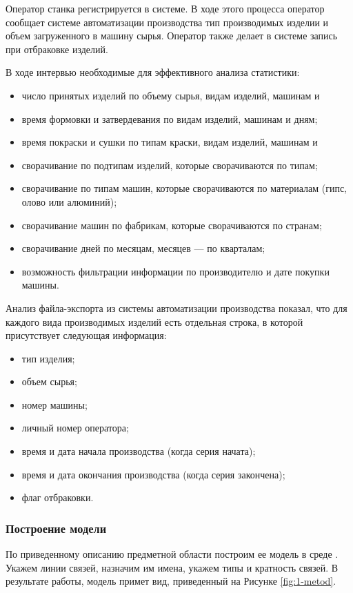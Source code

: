 Оператор станка регистрируется в системе. В ходе этого процесса оператор
сообщает системе автоматизации производства тип производимых изделии и
объем загруженного в машину сырья. Оператор также делает в системе запись
при отбраковке изделий.

В ходе
интервью необходимые для эффективного анализа статистики:
\begin{itemize}
	
	\item  число принятых изделий по объему сырья, видам изделий, машинам и
	\item  время формовки и затвердевания по видам изделий, машинам и дням;
	\item  время покраски и сушки по типам краски, видам изделий, машинам и
	\item  сворачивание по подтипам изделий, которые сворачиваются по типам;
	\item  сворачивание по типам машин, которые сворачиваются по материалам
	(гипс, олово или алюминий);
	\item  сворачивание машин по фабрикам, которые сворачиваются по странам;
	\item  сворачивание дней по месяцам, месяцев — по кварталам;
	\item  возможность фильтрации информации по производителю и дате покупки машины.
\end{itemize}

Анализ файла-экспорта из системы автоматизации производства показал,
что для каждого вида производимых изделий есть отдельная строка, в которой
присутствует следующая информация:
\begin{itemize}
	\item  тип изделия;
	\item  объем сырья;
	\item  номер машины;
	\item  личный номер оператора;
	\item  время и дата начала производства (когда серия начата);
	\item  время и дата окончания производства (когда серия закончена);
	\item  флаг отбраковки.
\end{itemize}
\subsubsection*{Построение модели}
По приведенному описанию предметной области построим ее модель в среде \erassistant. Укажем линии связей, назначим им имена, укажем типы и кратность связей. В результате работы, модель примет вид, приведенный на Рисунке \ref{fig:1-metod}.

